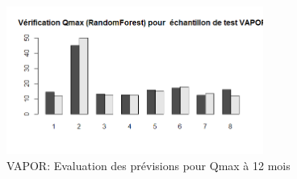 \begin{figure}[H]
\centering
\includegraphics[width=0.75\textwidth]{../Fig/VAPOR/vapor-forest-test-qmax12.png}
\caption{VAPOR: Evaluation des prévisions pour Qmax à 12 mois}
\label{fig-vapor-regtree-test-qmax12}
\end{figure}

